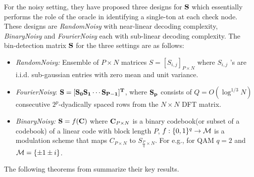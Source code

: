 For the noisy setting, they have proposed three designs for $\bf S$ which essentially performs the role of the oracle in identifying a single-ton at each check node. These designs are \emph{RandomNoisy} with near-linear decoding complexity, \emph{BinaryNoisy} and \emph{FourierNoisy} each with sub-linear decoding complexity.
The bin-detection matrix $\bf S$ for the three settings are as follows:
\begin{itemize}
\item \emph{RandomNoisy:}  Ensemble of $P \times N$ matrices $S = [S_{i,j}]_{P \times N}$ where $S_{i,j}$ $’$s are i.i.d. sub-gaussian entries with zero mean and unit variance.

\item  \emph{FourierNoisy}:  $\bf S = [S_0 S_1 \cdots S_{P-1}]^{T}$, where $\bf S_p$ consists of $Q=O(\log^{1/3}N)$ consecutive $2^p$-dyadically spaced rows from the $N \times N$ DFT matrix.

\item \emph{BinaryNoisy:}  $\mathbf{S} = f(\mathbf{C})$ where $\mathbf{C}_{P \times N}$ is a binary codebook(or subset of a codebook) of a linear code with block length $P$, $f:\{0,1\}^q\rightarrow \mathcal{M}$ is a modulation scheme that maps $C_{P \times N}$ to $S_{\frac{P}{q}\times N}$. For e.g., for QAM $q=2$ and $\mathcal{M}=\{\pm 1 \pm i\}$.
\end{itemize}

The following theorems from \cite{li2015subdraft} summarize their key results.



